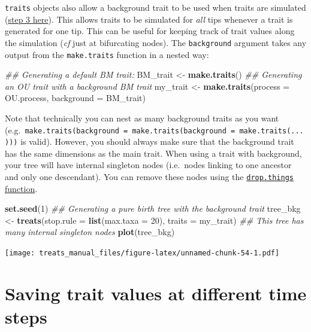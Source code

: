 \documentclass[
]{book}
\newenvironment{Shaded}{\begin{snugshade}}{\end{snugshade}}
\newcommand{\CommentTok}[1]{\textcolor[rgb]{0.56,0.35,0.01}{\textit{#1}}}
\newcommand{\DataTypeTok}[1]{\textcolor[rgb]{0.13,0.29,0.53}{#1}}
\newcommand{\DecValTok}[1]{\textcolor[rgb]{0.00,0.00,0.81}{#1}}
\newcommand{\KeywordTok}[1]{\textcolor[rgb]{0.13,0.29,0.53}{\textbf{#1}}}
\newcommand{\NormalTok}[1]{#1}
\newcommand{\StringTok}[1]{\textcolor[rgb]{0.31,0.60,0.02}{#1}}
\begin{document}
\texttt{traits} objects also allow a background trait to be used when traits are simulated (\protect\hyperlink{bdalgorithm}{step 3 here}).
This allows traits to be simulated for \emph{all} tips whenever a trait is generated for one tip.
This can be useful for keeping track of trait values along the simulation (\emph{cf} just at bifurcating nodes).
The \texttt{background} argument takes any output from the \texttt{make.traits} function in a nested way:

\begin{Shaded}
\begin{Highlighting}[]
\CommentTok{\#\# Generating a default BM trait:}
\NormalTok{BM\_trait \textless{}{-}}\StringTok{ }\KeywordTok{make.traits}\NormalTok{()}
\CommentTok{\#\# Generating an OU trait with a background BM trait}
\NormalTok{my\_trait \textless{}{-}}\StringTok{ }\KeywordTok{make.traits}\NormalTok{(}\DataTypeTok{process =}\NormalTok{ OU.process, }\DataTypeTok{background =}\NormalTok{ BM\_trait) }
\end{Highlighting}
\end{Shaded}

Note that technically you can nest as many background traits as you want (e.g.~\texttt{make.traits(background\ =\ make.traits(background\ =\ make.traits(...)))} is valid).
However, you should always make sure that the background trait has the same dimensions as the main trait.
When using a trait with background, your tree will have internal singleton nodes (i.e.~nodes linking to one ancestor and only one descendant).
You can remove these nodes using the \protect\hyperlink{dropthings}{\texttt{drop.things} function}.

\begin{Shaded}
\begin{Highlighting}[]
\KeywordTok{set.seed}\NormalTok{(}\DecValTok{1}\NormalTok{)}
\CommentTok{\#\# Generating a pure birth tree with the background trait}
\NormalTok{tree\_bkg \textless{}{-}}\StringTok{ }\KeywordTok{treats}\NormalTok{(}\DataTypeTok{stop.rule =} \KeywordTok{list}\NormalTok{(}\DataTypeTok{max.taxa =} \DecValTok{20}\NormalTok{),}
                 \DataTypeTok{traits =}\NormalTok{ my\_trait)}
\CommentTok{\#\# This tree has many internal singleton nodes}
\KeywordTok{plot}\NormalTok{(tree\_bkg)}
\end{Highlighting}
\end{Shaded}

\texttt{[image: treats\_manual\_files/figure-latex/unnamed-chunk-54-1.pdf]}

\hypertarget{saving-trait-values-at-different-time-steps}{%
\section{Saving trait values at different time steps}\label{saving-trait-values-at-different-time-steps}}
\end{document}
